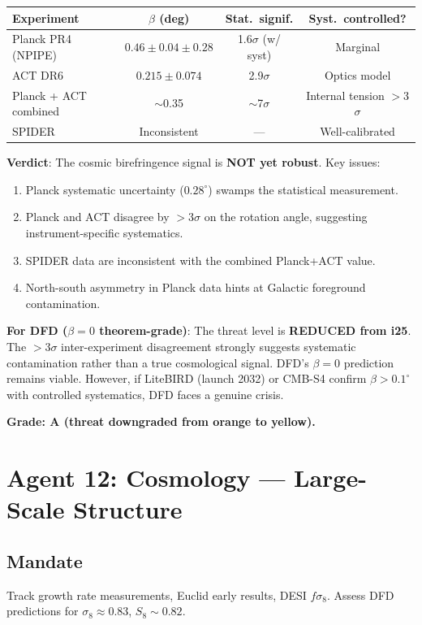 \documentclass[11pt,a4paper]{article}
\begin{document}
\begin{center}
\begin{tabular}{lccc}
\toprule
\textbf{Experiment} & $\beta$ (deg) & \textbf{Stat.\ signif.} & \textbf{Syst.\ controlled?} \\
\midrule
Planck PR4 (NPIPE) & $0.46 \pm 0.04 \pm 0.28$ & 1.6$\sigma$ (w/ syst) & Marginal \\
ACT DR6 & $0.215 \pm 0.074$ & 2.9$\sigma$ & Optics model \\
Planck + ACT combined & $\sim$0.35 & $\sim$7$\sigma$ & Internal tension $>$3$\sigma$ \\
SPIDER & Inconsistent & --- & Well-calibrated \\
\bottomrule
\end{tabular}
\end{center}

\textbf{Verdict}: The cosmic birefringence signal is \textbf{NOT yet robust}. Key issues:
\begin{enumerate}
\item Planck systematic uncertainty ($0.28^\circ$) swamps the statistical measurement.
\item Planck and ACT disagree by $>$3$\sigma$ on the rotation angle, suggesting instrument-specific systematics.
\item SPIDER data are inconsistent with the combined Planck+ACT value.
\item North-south asymmetry in Planck data hints at Galactic foreground contamination.
\end{enumerate}

\textbf{For DFD ($\beta = 0$ theorem-grade)}: The threat level is \textbf{REDUCED from i25}. The $>$3$\sigma$ inter-experiment disagreement strongly suggests systematic contamination rather than a true cosmological signal. DFD's $\beta = 0$ prediction remains viable. However, if LiteBIRD (launch 2032) or CMB-S4 confirm $\beta > 0.1^\circ$ with controlled systematics, DFD faces a genuine crisis.

\textbf{Grade: A (threat downgraded from orange to yellow).}

\section{Agent 12: Cosmology --- Large-Scale Structure}

\subsection{Mandate}
Track growth rate measurements, Euclid early results, DESI $f\sigma_8$. Assess DFD predictions for $\sigma_8 \approx 0.83$, $S_8 \sim 0.82$.
\end{document}
